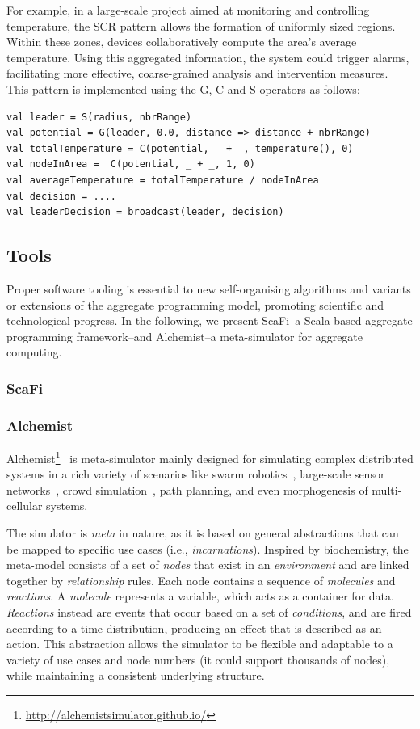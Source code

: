 For example, 
 in a large-scale project aimed at monitoring and controlling temperature, 
 the SCR pattern allows the formation of uniformly sized regions. 
 Within these zones, devices collaboratively compute the area's average temperature. 
 Using this aggregated information, the system could trigger alarms, facilitating more effective, coarse-grained analysis and intervention measures.
%
This pattern is implemented using the G, C and S operators as follows:
\begin{lstlisting}[language=scafi]
val leader = S(radius, nbrRange) 
val potential = G(leader, 0.0, distance => distance + nbrRange)
val totalTemperature = C(potential, _ + _, temperature(), 0)
val nodeInArea =  C(potential, _ + _, 1, 0)
val averageTemperature = totalTemperature / nodeInArea
val decision = ....
val leaderDecision = broadcast(leader, decision)
\end{lstlisting}
\subsection{Tools}
Proper software tooling
is essential to new self-organising algorithms
and variants or extensions of the aggregate programming model,
promoting scientific and technological progress.
In the following, we present ScaFi--a Scala-based aggregate programming framework--and Alchemist--a meta-simulator for aggregate computing.
\subsubsection{ScaFi}\label{sec:scafi}


\subsubsection{Alchemist}\label{coordination2023:alchemist}
Alchemist\footnote{\url{http://alchemistsimulator.github.io/}}~\cite{alchemist} is meta-simulator
 mainly designed for simulating complex distributed systems 
 in a rich variety of scenarios like swarm robotics~\cite{aguzzi2023macroswarm},
 large-scale sensor networks~\cite{Aguzzi_2022}, crowd simulation~\cite{aggregatecomputing},
 path planning, and even morphogenesis of multi-cellular systems.

The simulator is \emph{meta} in nature, 
 as it is based on general abstractions 
 that can be mapped to specific use cases (i.e., \emph{incarnations}).
% 
Inspired by biochemistry, 
 the meta-model consists of a set of \emph{nodes} 
 that exist in an \emph{environment} and are linked together by \emph{relationship} rules. 
 Each node contains a sequence of \emph{molecules} and \emph{reactions}. 
%
 A \emph{molecule} represents a variable, 
 which acts as a container for data. 
 \emph{Reactions} instead are events that occur based 
 on a set of \emph{conditions}, 
 and are fired according to a time distribution, 
 producing an effect that is described as an action. 
This abstraction allows the simulator to be flexible 
 and adaptable to a variety of use cases and node numbers 
 (it could support thousands of nodes), 
 while maintaining a consistent underlying structure.

